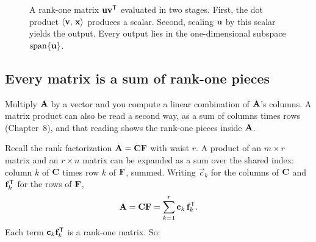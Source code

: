 \begin{figure}[H]
\centering
{}
\caption{A rank-one matrix $\protect\vec{u}\protect\vec{v}\protect\T$ evaluated in two
stages. First, the dot product $\protect\inner{\vec v}{\vec x}$ produces a scalar.
Second, scaling $\protect\vec{u}$ by this scalar yields the output. Every output
lies in the one-dimensional subspace $\protect\spn\{\protect\vec{u}\}$.}
\label{ch16:rankone}
\end{figure}

\subsection{Every matrix is a sum of rank-one pieces}

Multiply $\mat{A}$ by a vector and you compute a linear
combination of $\mat{A}$'s columns. A matrix product can also be read a second
way, as a sum of columns times rows (Chapter~8), and that reading shows the
rank-one pieces inside $\mat{A}$.

Recall the rank factorization $\mat{A}=\mat{C}\mat{F}$ with waist $r$. A product
of an $m\times r$ matrix and an $r\times n$ matrix can be expanded as a sum over
the shared index: column $k$ of $\mat{C}$ times row $k$ of $\mat{F}$, summed.
Writing $\vec{c}_k$ for the columns of $\mat{C}$ and $\vec{f}_k\T$ for the rows
of $\mat{F}$,
\[
  \mat{A} = \mat{C}\mat{F}
  = \sum_{k=1}^{r} \vec{c}_k\,\vec{f}_k\T.
\]
Each term $\vec{c}_k\vec{f}_k\T$ is a rank-one matrix. So:

